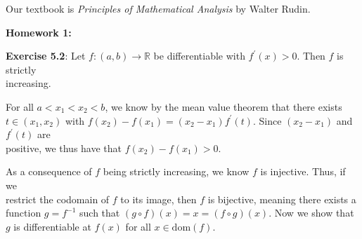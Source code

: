 \documentclass{book}
\newcommand{\pracOne}{
   \color{BrickRed}%
   \fontsize{13}{15}\selectfont%
}
\newcommand{\pracTwo}{
   \color{Orange}%
   \fontsize{12}{14}\selectfont%
}
\newenvironment{myIndent}{%
   \begin{adjustwidth}{2.5em}{0em}%
}{%
   \end{adjustwidth}%
}
\newcommand*{\markHW}[1]{%
   {\huge \color{Black} \textbf{#1} \newline}%
}
\newcommand{\domain}[1]{\mathrm{dom}(#1)}
\newcommand{\retTwo}{\hfill\bigbreak}
\begin{document}
\retTwo

Our textbook is \textit{Principles of Mathematical Analysis} by Walter Rudin.
















\newpage
\pracOne

\markHW{Homework 1:}

\textbf{Exercise 5.2}: Let $f: (a, b) \longrightarrow \mathbb{R}$ be differentiable with $f^\prime(x) > 0$. Then $f$ is strictly\\ increasing.

{\begin{myIndent}\pracTwo
   For all $a < x_1 < x_2 < b$, we know by the mean value theorem that there exists\\ $t \in (x_1, x_2)$ with $f(x_2) - f(x_1) = (x_2 - x_1)f^\prime(t)$. Since $(x_2 - x_1)$ and $f^\prime(t)$ are\\ positive, we thus have that $f(x_2) - f(x_1) > 0$.\retTwo
\end{myIndent}}

As a consequence of $f$ being strictly increasing, we know $f$ is injective. Thus, if we\\ restrict the codomain of $f$ to its image, then $f$ is bijective, meaning there exists a\\ function $g = f^{-1}$ such that $(g \circ f)(x) = x = (f \circ g)(x)$. Now we show that\\ $g$ is differentiable at $f(x)$ for all $x \in \domain{f}$.
\end{document}
